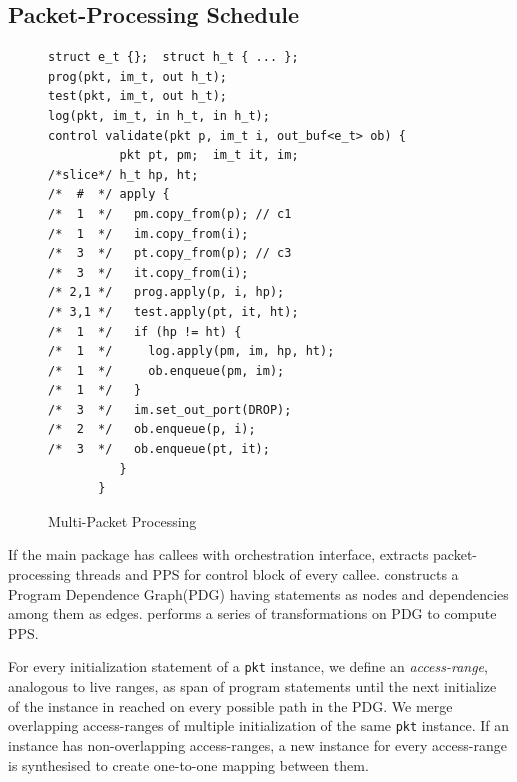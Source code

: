 \documentclass[letterpaper,twocolumn,10pt]{article}
\begin{document}
\subsection{Packet-Processing Schedule}
\label{subsubsection:packet-processing-schedule}


\begin{figure}[!h]
\begin{lstlisting}[frame=none]
struct e_t {};  struct h_t { ... };
prog(pkt, im_t, out h_t);
test(pkt, im_t, out h_t);
log(pkt, im_t, in h_t, in h_t);
control validate(pkt p, im_t i, out_buf<e_t> ob) {
          pkt pt, pm;  im_t it, im;  
/*slice*/ h_t hp, ht;
/*  #  */ apply {
/*  1  */   pm.copy_from(p); // c1
/*  1  */   im.copy_from(i);
/*  3  */   pt.copy_from(p); // c3 
/*  3  */   it.copy_from(i);
/* 2,1 */   prog.apply(p, i, hp); 
/* 3,1 */   test.apply(pt, it, ht); 
/*  1  */   if (hp != ht) {
/*  1  */     log.apply(pm, im, hp, ht);
/*  1  */     ob.enqueue(pm, im);
/*  1  */   }
/*  3  */   im.set_out_port(DROP);
/*  2  */   ob.enqueue(p, i);
/*  3  */   ob.enqueue(pt, it);
          }
       }
\end{lstlisting}
\caption{Multi-Packet Processing}
\label{fig:multi-packet-processing}
\end{figure}





If the main package has callees with orchestration interface, \ucomp 
extracts packet-processing threads and PPS for control block of every callee.
\ucomp constructs a Program Dependence Graph(PDG) 
\cite{Ferrante:1987:PDG:24039.24041} having statements as nodes and 
dependencies among them as edges. \ucomp  performs a series of transformations on PDG to compute PPS.



For every initialization statement of a \texttt{pkt} instance, we 
define an \emph{access-range}, analogous to live ranges, as span of 
program statements until the next initialize of the instance in 
reached on every possible path in the PDG.
We merge overlapping access-ranges of multiple initialization of the 
same \texttt{pkt} instance. If an instance has non-overlapping 
access-ranges, a new instance for every access-range is synthesised to 
create one-to-one mapping between them.
\end{document}
